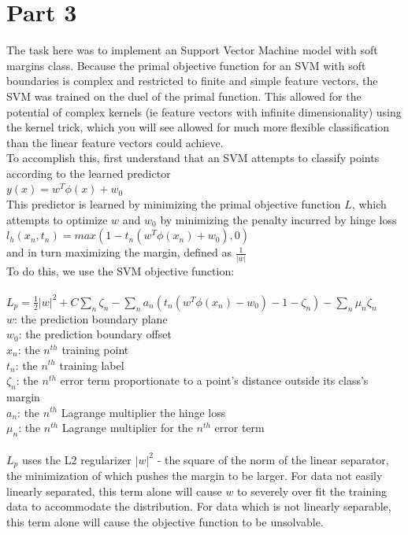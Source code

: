 \documentclass{article}
\begin{document}
\section{Part 3}

The task here was to implement an Support Vector Machine model with soft margins class. Because the primal objective function for an SVM with soft boundaries is complex and restricted to finite and simple feature vectors, the SVM was trained on the duel of the primal function. This allowed for the potential of complex kernels (ie feature vectors with infinite dimensionality) using the kernel trick, which you will see allowed for much more flexible classification than the linear feature vectors could achieve. \\
To accomplish this, first understand that an SVM attempts to classify points according to the learned predictor \\
$y(x) = w^T\phi(x) + w_0$\\
This predictor is learned by minimizing the primal objective function $L$, which attempts to optimize $w$ and $w_0$ by minimizing the penalty incurred by hinge loss \\
$l_h(x_n, t_n) = max(1 - t_n(w^T\phi(x_n) + w_0), 0)$\\
and in turn maximizing the margin, defined as $\frac{1}{|w|}$\\
To do this, we use the SVM objective function: \\
\\
$L_p = \frac{1}{2}|w|^2 + C \sum_n \zeta_n - \sum_n a_n(t_n(w^T\phi(x_n) - w_0) - 1 - \zeta_n) - \sum_n \mu_n\zeta_n$\\
$w$: the prediction boundary plane \\
$w_0$: the prediction boundary offset\\
$x_n$: the $n^{th}$ training point \\
$t_n$: the $n^{th}$ training label \\
$\zeta_n$: the $n^{th}$ error term proportionate to a point's distance outside its class's margin\\
$a_n$: the $n^{th}$ Lagrange multiplier the hinge loss\\
$\mu_n$: the $n^{th}$ Lagrange multiplier for the $n^{th}$ error term\\
\\
$L_p$ uses the L2 regularizer $|w|^2$ - the square of the norm of the linear separator, the minimization of which pushes the margin to be larger. For data not easily linearly separated, this term alone will cause $w$ to severely over fit the training data to accommodate the distribution. For data which is not linearly separable, this term alone will cause the objective function to be unsolvable. \\
\end{document}
